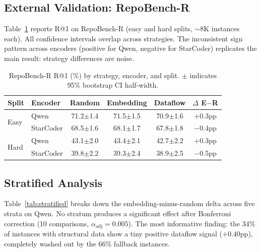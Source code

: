 \documentclass[11pt,a4paper]{article}
\begin{document}
\subsection{External Validation: RepoBench-R}
\label{sec:repobench}

Table~\ref{tab:repobench} reports R@1 on RepoBench-R (easy and hard splits, $\sim$8K instances each).
All confidence intervals overlap across strategies.
The inconsistent sign pattern across encoders (positive for Qwen, negative for StarCoder) replicates the main result: strategy differences are noise.

\begin{table}[t]
\centering
\caption{RepoBench-R R@1 (\%) by strategy, encoder, and split. $\pm$ indicates 95\% bootstrap CI half-width.}
\label{tab:repobench}
\small
\begin{tabular}{llcccc}
\toprule
\textbf{Split} & \textbf{Encoder} & \textbf{Random} & \textbf{Embedding} & \textbf{Dataflow} & \textbf{$\Delta$ E$-$R} \\
\midrule
\multirow{2}{*}{Easy} & Qwen & 71.2$\pm$1.4 & 71.5$\pm$1.5 & 70.9$\pm$1.6 & +0.3pp \\
 & StarCoder & 68.5$\pm$1.6 & 68.1$\pm$1.7 & 67.8$\pm$1.8 & $-$0.4pp \\
\midrule
\multirow{2}{*}{Hard} & Qwen & 43.1$\pm$2.0 & 43.4$\pm$2.1 & 42.7$\pm$2.2 & +0.3pp \\
 & StarCoder & 39.8$\pm$2.2 & 39.3$\pm$2.4 & 38.9$\pm$2.5 & $-$0.5pp \\
\bottomrule
\end{tabular}
\end{table}

\subsection{Stratified Analysis}
\label{sec:stratified}

Table~\ref{tab:stratified} breaks down the embedding-minus-random delta across five strata on Qwen.
No stratum produces a significant effect after Bonferroni correction (10 comparisons, $\alpha_{\text{adj}}=0.005$).
The most informative finding: the 34\% of instances with structural data show a tiny positive dataflow signal ($+0.40$pp), completely washed out by the 66\% fallback instances.
\end{document}
